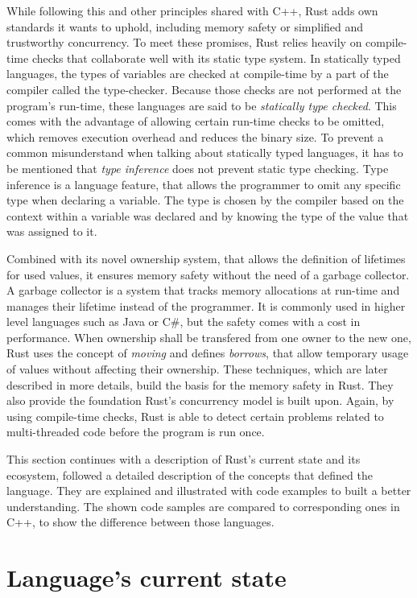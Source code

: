 While following this and other principles shared with C++, Rust adds own standards it wants to uphold, including memory safety or simplified and trustworthy concurrency. To meet these promises, Rust relies heavily on compile-time checks that collaborate well with its static type system. 
In statically typed languages, the types of variables are checked at compile-time by a part of the compiler called the type-checker. Because those checks are not performed at the program's run-time, these languages are said to be \textit{statically type checked}. This comes with the advantage of allowing certain run-time checks to be omitted, which removes execution overhead and reduces the binary size. To prevent a common misunderstand when talking about statically typed languages, it has to be mentioned that \textit{type inference} does not prevent static type checking. Type inference is a language feature, that allows the programmer to omit any specific type when declaring a variable. The type is chosen by the compiler based on the context within a variable was declared and by knowing the type of the value that was assigned to it. 

Combined with its novel ownership system, that allows the definition of lifetimes for used values, it ensures memory safety without the need of a garbage collector. A garbage collector is a system that tracks memory allocations at run-time and manages their lifetime instead of the programmer. It is commonly used in higher level languages such as Java or C\#, but the safety comes with a cost in performance. When ownership shall be transfered from one owner to the new one, Rust uses the concept of \textit{moving} and defines \textit{borrows}, that allow temporary usage of values without affecting their ownership. These techniques, which are later described in more details, build the basis for the memory safety in Rust. They also provide the foundation Rust's concurrency model is built upon. Again, by using compile-time checks, Rust is able to detect certain problems related to multi-threaded code before the program is run once. 

This section continues with a description of Rust's current state and its ecosystem, followed a detailed description of the concepts that defined the language. They are explained and illustrated with code examples to built a better understanding. The shown code samples are compared to corresponding ones in C++, to show the difference between those languages.

\section{Language's current state}

